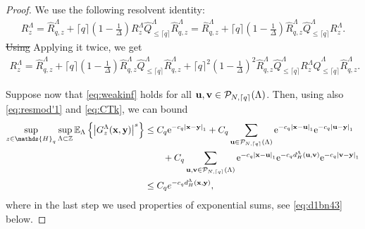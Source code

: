 \documentclass[12pt, a4paper,reqno]{amsart}
\numberwithin{equation}{section}
\newcommand\Z{\mathbb Z}
\newcommand\e{\mathrm{e}}
\newcommand\E{\mathbb E}
\newcommand\cP{\mathcal{P}}
\newcommand\what{\widehat}
\newcommand\be{\begin{equation}\begin{aligned}}
\newcommand\ee{\end{aligned}\end{equation}}
\newcommand{\abs}[1]{\left\lvert #1 \right\rvert}
\newcommand{\set}[1]{\left\{ #1 \right\}}
\newcommand{\pa}[1]{\left( #1 \right)}
\newcommand{\cl}[1]{\lceil #1 \rceil}
\newcommand\La{\Lambda}
\newcommand{\tfd}{\pa{1- \tfrac{1}{\Delta}}}
\newcommand{\clq}{\cl{q}}
\begin{document}
\begin{proof}


We use the following resolvent identity:
 \be\label{eq:resmodl}
R_{z}^{\Lambda}=\what  R^{\Lambda}_{q,z}+ \clq\tfd R^{\Lambda}_{z} \what Q^\Lambda_{\le \clq}\what  R^{\Lambda}_{q,z}=\what  R^{\Lambda}_{q,z}+ \clq \tfd\what  R^{\Lambda}_{q,z}\what Q^\Lambda_{\le \clq}  R^{\Lambda}_{z}.
\ee
\sout{Using} Applying it twice, we get 
 \be\label{eq:resmod'1}
R_{z}^{\Lambda}=\what  R^{\Lambda}_{q,z}+ \clq\tfd\what  R^{\Lambda}_{q,z} \what Q^\Lambda_{\le \clq} \what  R^{\Lambda}_{q,z}+\clq^2\tfd^2\what  R^{\Lambda}_{q,z}\what Q^\Lambda_{\le \clq}   R^{\Lambda}_{z} \what Q^\Lambda_{\le \clq}\what  R^{\Lambda}_{q,z}.
\ee 


Suppose now  that \eqref{eq:weakinf} holds for all  ${\bf u},{\bf v}\in \cP_{N,\cl{q}}(\La)$.   Then,   using  also \eqref{eq:resmod'1} and   \eqref{eq:CTk}, we can bound
\be\label{eq:genco}
 \sup_{z\in\mathds{H}_q}\sup_{\La\subset \Z}\E_\La\set{\abs{G^{ \La}_{z}({\bf x},{\bf y})}^s}&
 \le C_q  \e^{-c_q\abs{{\bf x}-{\bf y}}_1}+C_q\sum_{{\bf u}\in \cP_{N,\cl{q}}(\La)}\e^{-c_q\abs{{\bf x}-{\bf u}}_1}\e^{-c_q\abs{{\bf u}-{\bf y}}_1}\\& \quad  \quad +C_q  \sum_{{\bf u},{\bf v}\in \cP_{N,\cl{q}}(\La)}\e^{-c_q\abs{{\bf x}-{\bf u}}_1}\e^{-c_qd^\La_H\pa{{\bf u},{\bf v}}}\e^{-c_q\abs{{\bf v}-{\bf y}}_1}\\ &\le  C_q    e^{-c_qd^\La_H\pa{{\bf x},{\bf y}}},
\ee 
where in the last step we used  properties of exponential sums, see \eqref{eq:d1bn43} below. 
\end{proof}
\end{document}
